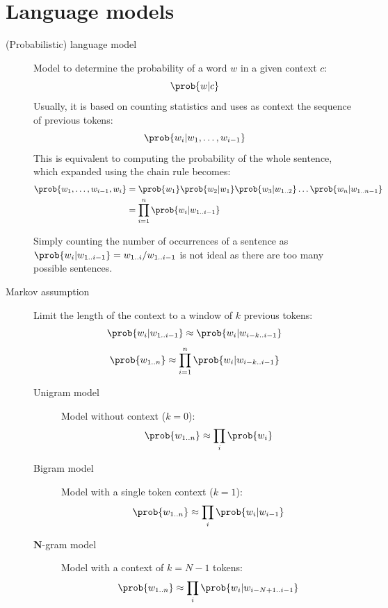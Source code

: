 \section{Language models}

\begin{description}
    \item[(Probabilistic) language model] 
        Model to determine the probability of a word $w$ in a given context $c$:
        \[ \prob{w | c} \]
        Usually, it is based on counting statistics and uses as context the sequence of previous tokens:
        \[ \prob{w_i | w_1, \dots, w_{i-1}} \]
        This is equivalent to computing the probability of the whole sentence, which expanded using the chain rule becomes:
        \[
            \begin{split}
                \prob{w_1, \dots, w_{i-1}, w_i} &= \prob{w_1} \prob{w_2 | w_1} \prob{w_3 | w_{1..2}} \dots \prob{w_n | w_{1..n-1}} \\
                &= \prod_{i=1}^{n} \prob{w_i | w_{1..i-1}}
            \end{split}
        \]

        \begin{remark}
            Simply counting the number of occurrences of a sentence as $\prob{w_i | w_{1..i-1}} = w_{1..i} / w_{1..i-1}$ is not ideal as there are too many possible sentences.
        \end{remark}

    \item[Markov assumption] 
        Limit the length of the context to a window of $k$ previous tokens:
        \[ \prob{w_i | w_{1..i-1}} \approx \prob{w_i | w_{i-k..i-1}} \]
        \[ \prob{w_{1..n}} \approx \prod_{i=1}^{n} \prob{w_i | w_{i-k..i-1}} \]

        \begin{description}
            \item[Unigram model]
                Model without context ($k=0$):
                \[ \prob{w_{1..n}} \approx \prod_i \prob{w_i} \]

            \item[Bigram model]
                Model with a single token context ($k=1$):
                \[ \prob{w_{1..n}} \approx \prod_i \prob{w_i | w_{i-1}} \]

            \item[$\mathbf{N}$-gram model] 
                Model with a context of $k=N-1$ tokens:
                \[ \prob{w_{1..n}} \approx \prod_i \prob{w_i | w_{i-N+1..i-1}} \]


\end{description}
\end{description}
